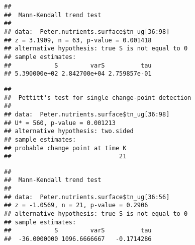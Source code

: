 \documentclass[]{article}
\newenvironment{Shaded}{\begin{snugshade}}{\end{snugshade}}
\newcommand{\KeywordTok}[1]{\textcolor[rgb]{0.13,0.29,0.53}{\textbf{#1}}}
\newcommand{\DecValTok}[1]{\textcolor[rgb]{0.00,0.00,0.81}{#1}}
\newcommand{\CommentTok}[1]{\textcolor[rgb]{0.56,0.35,0.01}{\textit{#1}}}
\newcommand{\OperatorTok}[1]{\textcolor[rgb]{0.81,0.36,0.00}{\textbf{#1}}}
\newcommand{\NormalTok}[1]{#1}
\begin{document}
\begin{verbatim}
## 
##  Mann-Kendall trend test
## 
## data:  Peter.nutrients.surface$tn_ug[36:98]
## z = 3.1909, n = 63, p-value = 0.001418
## alternative hypothesis: true S is not equal to 0
## sample estimates:
##            S         varS          tau 
## 5.390000e+02 2.842700e+04 2.759857e-01
\end{verbatim}

\begin{Shaded}
\end{Shaded}

\begin{verbatim}
## 
##  Pettitt's test for single change-point detection
## 
## data:  Peter.nutrients.surface$tn_ug[36:98]
## U* = 560, p-value = 0.001213
## alternative hypothesis: two.sided
## sample estimates:
## probable change point at time K 
##                              21
\end{verbatim}

\begin{Shaded}
\end{Shaded}

\begin{verbatim}
## 
##  Mann-Kendall trend test
## 
## data:  Peter.nutrients.surface$tn_ug[36:56]
## z = -1.0569, n = 21, p-value = 0.2906
## alternative hypothesis: true S is not equal to 0
## sample estimates:
##            S         varS          tau 
##  -36.0000000 1096.6666667   -0.1714286
\end{verbatim}

\begin{Shaded}
\end{Shaded}
\end{document}
